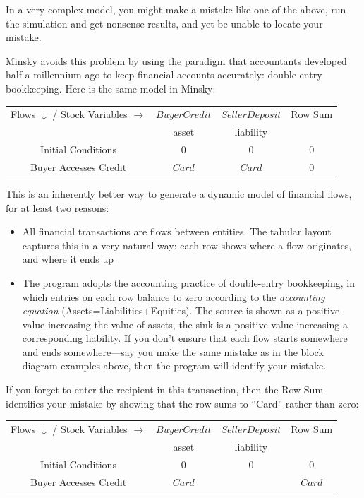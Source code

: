 In a very complex model, you might make a mistake like one of the above, run the simulation and get nonsense results, and yet be unable to locate your mistake.


Minsky avoids this problem by using the paradigm that accountants
developed half a millennium ago to keep financial accounts accurately:
double-entry bookkeeping. Here is the same model in Minsky:

\begin{center}
\begin{tabular}{|c|cc|c|}
\hline
Flows $\downarrow$ / Stock Variables
$\rightarrow$&\multicolumn{1}{|c|}{$BuyerCredit$}&\multicolumn{1}{|c|}{$SellerDeposit$}&Row Sum\\\cline{2-3}&\multicolumn{1}{|c|}{asset}&\multicolumn{1}{|c|}{liability}&\\\hline
Initial Conditions&$0$&$0$&0\\
Buyer Accesses Credit&$Card$&$Card$&0\\
\hline
\end{tabular}
\end{center}

This is an inherently better way to generate a dynamic model of financial flows, for at least two reasons:
\begin{itemize}
\item All financial transactions are flows between entities. The
  tabular layout captures this in a very natural way: each row shows
  where a flow originates, and where it ends up
\item The program adopts the accounting practice of double-entry
  bookkeeping, in which entries on each row balance to zero according
  to the {\em accounting equation} (Assets=Liabilities+Equities). The source is
  shown as a positive value increasing the value of assets, the sink
  is a positive value increasing a corresponding liability. If you
  don't ensure that each flow starts somewhere and ends
  somewhere---say you make the same mistake as in the block diagram
  examples above, then the program will identify your mistake.
\end{itemize}

If you forget to enter the recipient in this transaction, then the Row
Sum identifies your mistake by showing that the row sums to ``Card''
rather than zero:

\begin{center}
\begin{tabular}{|c|cc|c|}
\hline
Flows $\downarrow$ / Stock Variables
$\rightarrow$&\multicolumn{1}{|c|}{$BuyerCredit$}&\multicolumn{1}{|c|}{$SellerDeposit$}&Row Sum\\\cline{2-3}&\multicolumn{1}{|c|}{asset}&\multicolumn{1}{|c|}{liability}&\\\hline
Initial Conditions&$0$&$0$&0\\
Buyer Accesses Credit&$Card$&&$Card$\\
\hline
\end{tabular}
\end{center}

